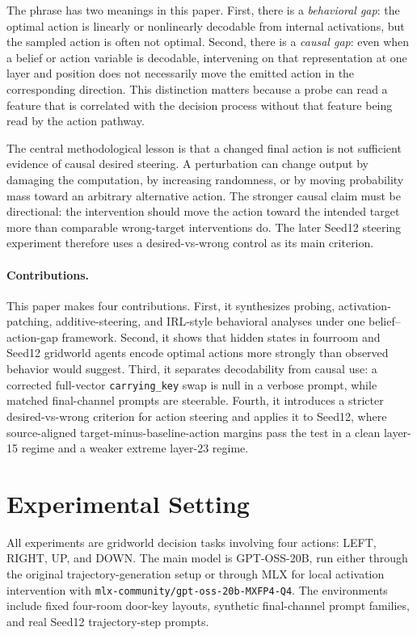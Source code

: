 \documentclass[11pt]{article}
\begin{document}
The phrase has two meanings in this paper.
First, there is a \emph{behavioral gap}: the optimal action is linearly or nonlinearly decodable from internal activations, but the sampled action is often not optimal.
Second, there is a \emph{causal gap}: even when a belief or action variable is decodable, intervening on that representation at one layer and position does not necessarily move the emitted action in the corresponding direction.
This distinction matters because a probe can read a feature that is correlated with the decision process without that feature being read by the action pathway.

The central methodological lesson is that a changed final action is not sufficient evidence of causal desired steering.
A perturbation can change output by damaging the computation, by increasing randomness, or by moving probability mass toward an arbitrary alternative action.
The stronger causal claim must be directional: the intervention should move the action toward the intended target more than comparable wrong-target interventions do.
The later Seed12 steering experiment therefore uses a desired-vs-wrong control as its main criterion.

\paragraph{Contributions.}
This paper makes four contributions.
First, it synthesizes probing, activation-patching, additive-steering, and IRL-style behavioral analyses under one belief--action-gap framework.
Second, it shows that hidden states in fourroom and Seed12 gridworld agents encode optimal actions more strongly than observed behavior would suggest.
Third, it separates decodability from causal use: a corrected full-vector \texttt{carrying\_key} swap is null in a verbose prompt, while matched final-channel prompts are steerable.
Fourth, it introduces a stricter desired-vs-wrong criterion for action steering and applies it to Seed12, where source-aligned target-minus-baseline-action margins pass the test in a clean layer-15 regime and a weaker extreme layer-23 regime.

\section{Experimental Setting}

All experiments are gridworld decision tasks involving four actions: LEFT, RIGHT, UP, and DOWN.
The main model is GPT-OSS-20B, run either through the original trajectory-generation setup or through MLX for local activation intervention with \texttt{mlx-community/gpt-oss-20b-MXFP4-Q4}.
The environments include fixed four-room door-key layouts, synthetic final-channel prompt families, and real Seed12 trajectory-step prompts.
\end{document}
